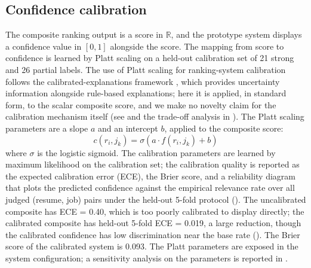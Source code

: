 \subsection{Confidence calibration}\label{sec:3.7}
The composite ranking output is a score in $\mathbb{R}$, and the prototype system displays a confidence value in $[0, 1]$ alongside the score.
The mapping from score to confidence is learned by Platt scaling \citep{platt1999probabilistic,guo2017calibration,lofstrom2024calibrated} on a held-out calibration set of 21 strong and 26 partial labels.
The use of Platt scaling for ranking-system calibration follows the calibrated-explanations framework \citep{lofstrom2024calibrated}, which provides uncertainty information alongside rule-based explanations; here it is applied, in standard form, to the scalar composite score, and we make no novelty claim for the calibration mechanism itself (see  and the trade-off analysis in ).
The Platt scaling parameters are a slope $a$ and an intercept $b$, applied to the composite score:
\begin{equation}
c(r_i, j_k) = \sigma(a \cdot f(r_i, j_k) + b)
\end{equation}
where $\sigma$ is the logistic sigmoid.
The calibration parameters are learned by maximum likelihood on the calibration set; the calibration quality is reported as the expected calibration error (ECE), the Brier score, and a reliability diagram that plots the predicted confidence against the empirical relevance rate over all judged (resume, job) pairs under the held-out 5-fold protocol ().
The uncalibrated composite has ECE = 0.40, which is too poorly calibrated to display directly; the calibrated composite has held-out 5-fold ECE = 0.019, a large reduction, though the calibrated confidence has low discrimination near the base rate ().
The Brier score of the calibrated system is 0.093.
The Platt parameters are exposed in the system configuration; a sensitivity analysis on the parameters is reported in .

